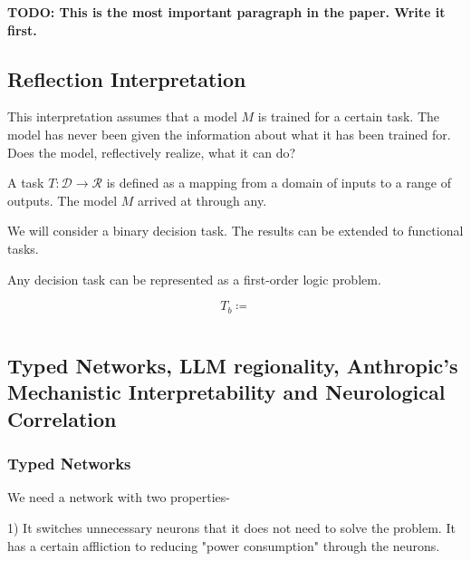 \documentclass{article}
\begin{document}

\textbf{TODO: This is the most important paragraph in the paper. Write it first.}


\subsection{Reflection Interpretation}
This interpretation assumes that a model $M$ is trained for a certain task.
The model has never been given the information about what it has been trained
for. Does the model, reflectively realize, what it can do?

A task $T: \mathcal{D} \rightarrow \mathcal{R}$ is defined as a mapping from a
domain of inputs to a range of outputs. The model $M$ arrived at through any.

We will consider a binary decision task. The results can be extended to
functional tasks.

Any decision task can be represented as a first-order logic problem.

\[
	T_b \coloneqq
\]

$$$$




\subsection{Typed Networks, LLM regionality, Anthropic's Mechanistic
	Interpretability and Neurological Correlation}

\subsubsection{Typed Networks}
We need a network with two properties-

1) It switches unnecessary neurons that it does not need to solve the problem.
It has a certain affliction to reducing "power consumption" through the neurons.
\end{document}
